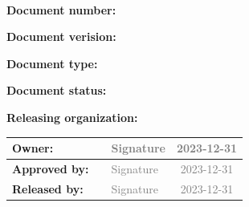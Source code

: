 \vspace{3cm}

\begin{center}
  \begin{tcolorbox}[colframe=andesbrown, colback=andesgray, width=\textwidth]
    \

    \begin{center}
      {\bf \Large \bigskip \textcolor{andesbrown} \ESOdoctitle{} }
    \end{center}

    \bigskip

    \bigskip

    {\bf Document number:} \ESOdocnumber{}

    \medskip

    {\bf Document verision:} \ESOdocversion{}

    \smallskip

    {\bf Document type:} \ESOdoctype{}

    \smallskip

    {\bf Document status:} \ESOdocstatus{}

    \smallskip

    {\bf Releasing organization:} \ESOdocorganization{}

    \bigskip

  \end{tcolorbox}
\end{center}

\vfill

\begin{center}
  \begin{tabularx}{\textwidth}{|l|X|l|c|}
    \hline
    {\bf \small Owner:}       &  \ESOowner{}             & \textcolor{gray}{Signature} & \textcolor{gray}{2023-12-31} \\[0.8cm] \hline
    {\bf \small Approved by:} &  \ESOapprovedby{}        & \textcolor{gray}{Signature} & \textcolor{gray}{2023-12-31} \\[0.8cm] \hline
    {\bf \small Released by:} &  \ESOreleasedby{}        & \textcolor{gray}{Signature} & \textcolor{gray}{2023-12-31} \\[0.8cm] \hline
    \end{tabularx}
\end{center}


\restoregeometry

